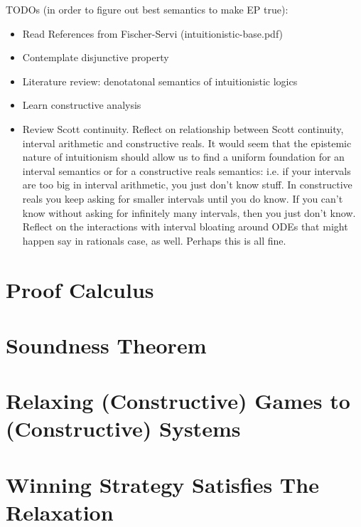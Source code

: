 \documentclass[12pt]{cmuthesis}
\theoremstyle{definition}
\theoremstyle{remark}
\begin{document}
{\Huge TODOs} (in order to figure out best semantics to make EP true):
\begin{itemize}
\item Read References from Fischer-Servi (intuitionistic-base.pdf)
\item Contemplate disjunctive property
\item Literature review: denotatonal semantics of intuitionistic logics
\item Learn constructive analysis
\item Review Scott continuity. Reflect on relationship between Scott continuity, interval arithmetic and constructive reals.
  It would seem that the epistemic nature of intuitionism should allow us to find a uniform foundation for an interval semantics or for a constructive reals semantics: i.e. if your intervals are too big in interval arithmetic, you just don't know stuff. In constructive reals you keep asking for smaller intervals until you do know. If you can't know without asking for infinitely many intervals, then you just don't know.
Reflect on the interactions with interval bloating around ODEs that might happen say in rationals case, as well. Perhaps this is all fine.
\end{itemize}
\section{Proof Calculus}

\section{Soundness Theorem}
\section{Relaxing (Constructive) Games to (Constructive) Systems}
\section{Winning Strategy Satisfies The Relaxation}
\end{document}
